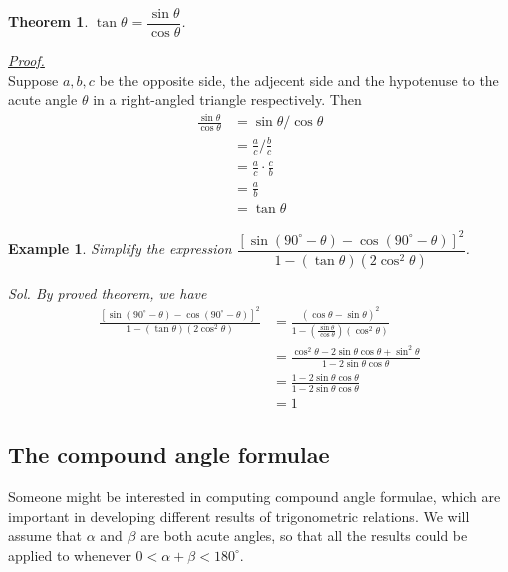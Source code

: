 \documentclass[12pt]{article}
\newtheorem*{theorem}{Theorem}
\newtheorem*{example}{Example}
\renewenvironment{proof}[1][Proof]{\begin{snugshade*} \underline{\textit{{#1}.}}\\}{\hfill \qedsymbol \end{snugshade*}}
\begin{document}
    \begin{theorem}
        $\tan{\theta}=\dfrac{\sin{\theta}}{\cos{\theta}}$.
    \end{theorem}

    \begin{proof}
        Suppose $a,b,c$ be the opposite side, the adjecent side and the hypotenuse to the acute angle $\theta$ in a right-angled triangle respectively. Then \begin{align*}
            \frac{\sin{\theta}}{\cos{\theta}}&=\sin{\theta}/ \cos{\theta}\\
            &=\frac{a}{c}/ \frac{b}{c}\\
            &=\frac{a}{c}\cdot \frac{c}{b}\\
            &=\frac{a}{b}\\
            &=\tan{\theta}
        \end{align*}
    \end{proof}

    \begin{example}
        Simplify the expression $\dfrac{[\sin(90^\circ - \theta) - \cos(90^\circ - \theta)]^2}{1-(\tan{\theta})(2\cos^2{\theta})}$.

        \textit{ Sol. }By proved theorem, we have \begin{align*}
            \frac{[\sin(90^\circ - \theta) - \cos(90^\circ - \theta)]^2}{1-(\tan{\theta})(2\cos^2{\theta})} &= \frac{(\cos{\theta}-\sin{\theta})^2}{1-(\frac{\sin{\theta}}{\cos{\theta}})(\cos^2{\theta})}\\
            &= \frac{\cos^2{\theta}-2\sin{\theta}\cos{\theta}+\sin^2{\theta}}{1-2\sin{\theta}\cos{\theta}}\\
            &= \frac{1-2\sin{\theta}\cos{\theta}}{1-2\sin{\theta}\cos{\theta}}\\
            &= 1
        \end{align*}
    \end{example}

    \subsection{The compound angle formulae}

    Someone might be interested in computing compound angle formulae, which are important in developing different results of trigonometric relations. We will assume that $\alpha$ and $\beta$ are both acute angles, so that all the results could be applied to whenever $0<\alpha+\beta<180^\circ$.
\end{document}
